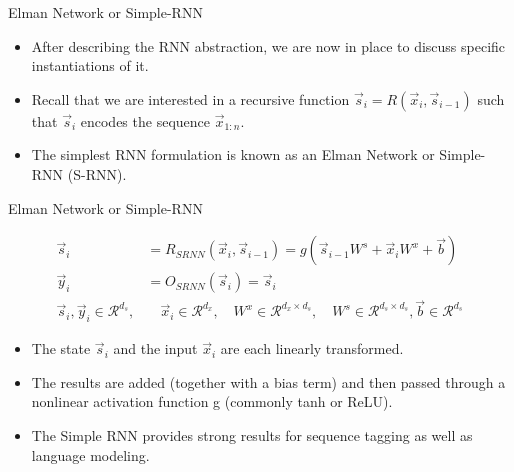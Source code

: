 \documentclass[handout]{beamer}
\begin{document}
\begin{frame}{Elman Network or Simple-RNN}
\begin{scriptsize}
\begin{itemize}
\item After describing the RNN abstraction, we are now in place to discuss specific instantiations of it.
\item Recall that we are interested in a recursive function $\vec{s}_i =  R(\vec{x}_i, \vec{s}_{i-1})$ such that $\vec{s}_i$ encodes the sequence $\vec{x}_{1:n}$.
\item The simplest RNN formulation is known as an Elman Network or Simple-RNN (S-RNN).
\end{itemize}
\end{scriptsize}
\end{frame}

\begin{frame}{Elman Network or Simple-RNN}
\begin{scriptsize}
\begin{equation}
\begin{split}
\vec{s}_i & = R_{SRNN}(\vec{x}_{i},\vec{s}_{i-1}) = g(\vec{s}_{i-1}W^{s}+\vec{x}_{i}W^{x}+\vec{b}) \\
\vec{y}_i & = O_{SRNN}(\vec{s}_i) = \vec{s}_i \\
\vec{s}_i, \vec{y}_i \in  \mathcal{R}^{d_{s}}, & \quad  \vec{x}_i  \in \mathcal{R}^{d_{x}}, \quad W^{x} \in \mathcal{R}^{d_{x}\times d_{s}}, \quad W^{s} \in \mathcal{R}^{d_{s}\times d_{s}}, \vec{b} \in \mathcal{R}^{d_{s}} 
\end{split}
\end{equation}


\begin{itemize}
\item The state $\vec{s}_i$ and the input $\vec{x}_i$ are each linearly transformed.
\item The results are added (together with a bias term) and then passed through a nonlinear activation function g (commonly tanh or ReLU).
\item The Simple RNN provides strong results for sequence tagging as well as language modeling.
\end{itemize}
\end{scriptsize}
\end{frame}
\end{document}
